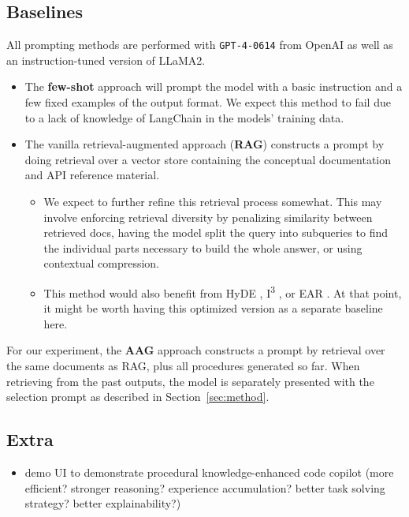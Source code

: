 \documentclass{article}
\begin{document}
\subsection{Baselines}

All prompting methods are performed with \texttt{GPT-4-0614} from OpenAI as well as an instruction-tuned version of LLaMA2.

\begin{itemize}
   \item The \textbf{few-shot} approach will prompt the model with a basic instruction and a few fixed examples of the output format. We expect this method to fail due to a lack of knowledge of LangChain in the models' training data.
   \item The vanilla retrieval-augmented approach (\textbf{RAG}) constructs a prompt by doing retrieval over a vector store containing the conceptual documentation and API reference material.
         \begin{itemize}
            \item We expect to further refine this retrieval process somewhat. This may involve enforcing retrieval diversity by penalizing similarity between retrieved docs, having the model split the query into subqueries to find the individual parts necessary to build the whole answer, or using contextual compression.
            \item This method would also benefit from HyDE \citep{hyde}, I\textsuperscript{3} \citep{i3}, or EAR \citep{ear}. At that point, it might be worth having this optimized version as a separate baseline here.
         \end{itemize}
\end{itemize}

For our experiment, the \textbf{AAG} approach constructs a prompt by retrieval over the same documents as RAG, plus all procedures generated so far. When retrieving from the past outputs, the model is separately presented with the selection prompt as described in Section~\ref{sec:method}.

\subsection{Extra}

\begin{itemize}
   \item demo UI to demonstrate procedural knowledge-enhanced code copilot (more efficient? stronger reasoning? experience accumulation? better task solving strategy? better explainability?)
\end{itemize}



\end{document}
